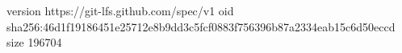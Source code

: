version https://git-lfs.github.com/spec/v1
oid sha256:46d1f19186451e25712e8b9dd3c5fcf0883f756396b87a2334eab15c6d50eccd
size 196704
